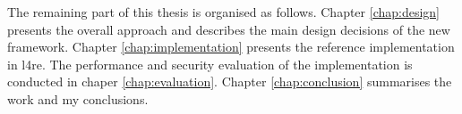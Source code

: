The remaining part of this thesis is organised as follows.
Chapter \ref{chap:design} presents the overall approach and describes the main design decisions of the new framework.
Chapter \ref{chap:implementation} presents the reference implementation in \ac{l4re}.
The performance and security evaluation of the implementation is conducted in chaper \ref{chap:evaluation}.
Chapter \ref{chap:conclusion} summarises the work and my conclusions.
